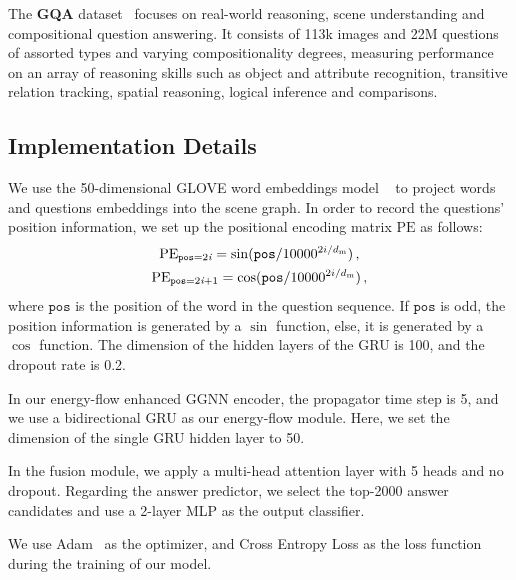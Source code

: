\documentclass[letterpaper]{article} %
\begin{document}
The \textbf{GQA} dataset~\cite{DBLP:conf/cvpr/HudsonM19} focuses on real-world reasoning, scene understanding and compositional question answering. It consists of 113k images and 22M questions of assorted types and varying compositionality degrees, measuring performance on an array of reasoning skills such as object and attribute recognition, transitive relation tracking, spatial reasoning, logical inference and comparisons.



\subsection{Implementation Details}

We use the 50-dimensional GLOVE word embeddings model ~\cite{pennington-etal-2014-glove} to project words and questions embeddings into the scene graph. 
In order to record the questions' position information, we set up the positional encoding matrix $\textrm{PE}$ as follows:
\begin{gather}\notag
    \textrm{PE}_{\texttt{pos}=2\emph{i}} = \sin(\texttt{pos}/10000^{2i/d_{\textrm{m}}}) \, ,\\
    \textrm{PE}_{\texttt{pos}=2\emph{i}+1} = \cos(\texttt{pos}/10000^{2i/d_{\textrm{m}}}) \, , \notag
\end{gather}
where $\texttt{pos}$ is the position of the word in the question sequence. 
If $\texttt{pos}$ is odd, the position information is generated by a $\sin$ function, else, it is generated by a $\cos$ function. 
The dimension of the hidden layers of the GRU is 100, and the dropout rate is 0.2.

 In our energy-flow enhanced GGNN encoder, the propagator time step is 5, and we use a bidirectional GRU as our energy-flow module. 
 Here, we set the dimension of the single GRU hidden layer to 50. 

 In the fusion module, we apply a multi-head attention layer with 5 heads and no dropout. Regarding the answer predictor, we select the top-2000 answer candidates and use a 2-layer MLP as the output classifier.

We use Adam~\cite{kingma2014adam} as the optimizer, and Cross Entropy Loss as the loss function during the training of our model. 
\end{document}
